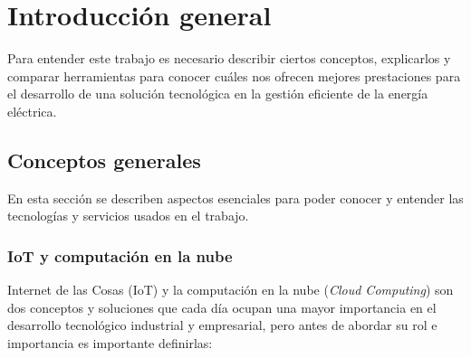 
\chapter{Introducción general} %

\label{Chapter1} %
\label{IntroGeneral}
Para entender este trabajo es necesario describir ciertos conceptos, explicarlos y comparar herramientas para conocer cuáles nos ofrecen mejores prestaciones para el desarrollo de una solución tecnológica en la gestión eficiente de la energía eléctrica. 

\newcommand{\keyword}[1]{\textbf{#1}}
\newcommand{\tabhead}[1]{\textbf{#1}}
\newcommand{\code}[1]{\texttt{#1}}
\newcommand{\file}[1]{\texttt{\bfseries#1}}
\newcommand{\option}[1]{\texttt{\itshape#1}}
\newcommand{\grados}{$^{\circ}$}




\section{Conceptos generales}

En esta sección se describen aspectos esenciales para poder conocer y entender las tecnologías y servicios usados en el trabajo.

\subsection{IoT y computación en la nube}

Internet de las Cosas (IoT) y la computación en la nube (\emph{Cloud Computing}) son dos conceptos y soluciones que cada día ocupan una mayor importancia en el desarrollo tecnológico industrial y empresarial, pero antes de abordar su rol e importancia es importante definirlas:



